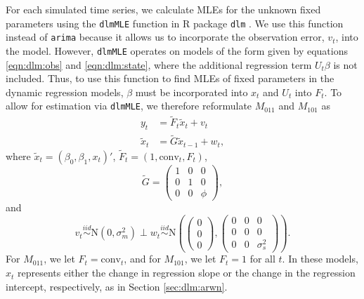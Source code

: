 For each simulated time series, we calculate MLEs for the unknown fixed parameters using the {\tt dlmMLE} function in R package {\tt dlm} \citep{petris:camp:2009:dynamic}. We use this function instead of {\tt arima} because it allows us to incorporate the observation error, $v_t$, into the model. However, {\tt dlmMLE} operates on models of the form given by equations \eqref{eqn:dlm:obs} and \eqref{eqn:dlm:state}, where the additional regression term $U_t\beta$ is not included. Thus, to use this function to find MLEs of fixed parameters in the dynamic regression models, $\beta$ must be incorporated into $x_t$ and $U_t$ into $F_t$. To allow for estimation via {\tt dlmMLE}, we therefore reformulate $M_{011}$ and $M_{101}$ as
\begin{align}
y_t &= \tilde{F}_t\tilde{x}_t + v_t \label{eqn:dlmmle:obs} \\
\tilde{x}_t &= \tilde{G}\tilde{x}_{t-1} + w_t, \label{eqn:dlmmle:state}
\end{align}
where $\tilde{x}_t = (\beta_0,\beta_1,x_t)'$, $\tilde{F}_t = (1,\mbox{conv}_t,F_t)$,
\[\tilde{G} = \left(\begin{array}{ccc} 1 & 0 & 0 \\ 0 & 1 & 0 \\ 0 & 0 & \phi\end{array}\right), \]
and \[v_t \stackrel{iid}{\sim} \mbox{N}(0,\sigma^2_m) \perp w_t \stackrel{iid}{\sim} \mbox{N}\left(\left(\begin{array}{c} 0 \\ 0 \\ 0 \end{array}\right), \left(\begin{array}{ccc} 0 & 0 & 0 \\ 0 & 0 & 0 \\ 0 & 0 & \sigma^2_s \end{array}\right)\right).\]
For $M_{011}$, we let $F_t = \mbox{conv}_t$, and for $M_{101}$, we let $F_t = 1$ for all $t$. In these models, $x_t$ represents either the change in regression slope or the change in the regression intercept, respectively, as in Section \eqref{sec:dlm:arwn}.

